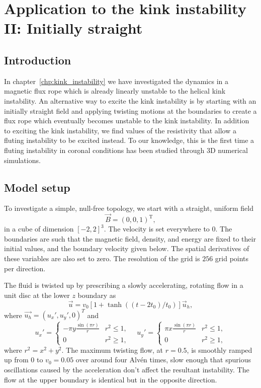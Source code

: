 \chapter{Application to the kink instability II: Initially straight}

\graphicspath{{images/kink_instability/}}

\section{Introduction}

In chapter~\ref{chp:kink_instability} we have investigated the dynamics in a magnetic flux rope which is already linearly unstable to the helical kink instability. An alternative way to excite the kink instability is by starting with an initially straight field and applying twisting motions at the boundaries to create a flux rope which eventually becomes unstable to the kink instability. In addition to exciting the kink instability, we find values of the resistivity that allow a fluting instability to be excited instead. To our knowledge, this is the first time a fluting instability in coronal conditions has been studied through 3D numerical simulations. 

\section{Model setup}

To investigate a simple, null-free topology, we start with a straight, uniform field
\begin{equation}
\vec{B} = (0, 0, 1)^{\text{T}},
\end{equation}
in a cube of dimension $[-2,2]^3$. The velocity is set everywhere to $0$. The boundaries are such that the magnetic field, density, and energy are fixed to their initial values, and the boundary velocity given below. The spatial derivatives of these variables are also set to zero. The resolution of the grid is $256$ grid points per direction. 

The fluid is twisted up by prescribing a slowly accelerating, rotating flow in a unit disc at the lower $z$ boundary as
\begin{equation}
\vec{u} = v_0 [1 + \tanh((t - 2t_0)/t_0)] \vec{u}_h,
\end{equation}
where $\vec{u_h} = (u_x', u_y', 0)^T$ and
\begin{equation}
u_x' = 
  \begin{cases} 
    -\pi y \frac{\sin(\pi r)}{r} & r^2 \le 1, \\
    0 & r^2 \geq 1,
  \end{cases}
\quad
u_y' = 
  \begin{cases} 
    \pi x \frac{\sin(\pi r)}{r} & r^2 \le 1, \\
    0 & r^2 \geq 1,
  \end{cases}
\end{equation}
where $r^2 = x^2 + y^2$. The maximum twisting flow, at $r=0.5$, is smoothly ramped up from $0$ to $v_0 = 0.05$ over around four Alv\'en times, slow enough that spurious oscillations caused by the acceleration don't affect the resultant instability. The flow at the upper boundary is identical but in the opposite direction.

